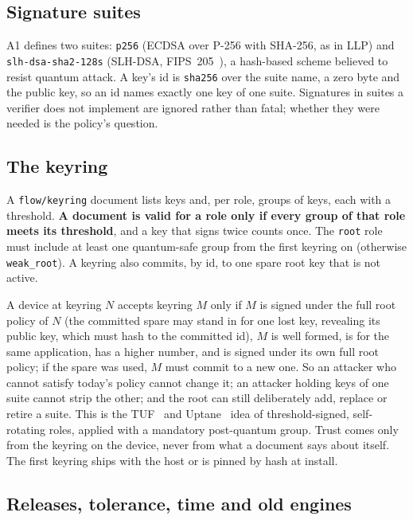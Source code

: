 \documentclass[10pt,twocolumn]{article}
\newcommand{\code}[1]{\texttt{#1}}
\begin{document}
\subsection{Signature suites}

A1 defines two suites: \code{p256} (ECDSA over P-256 with SHA-256, as in LLP) and
\code{slh-dsa-sha2-128s} (SLH-DSA, FIPS~205~\cite{fips205}), a hash-based scheme believed to resist
quantum attack. A key's id is \code{sha256} over the suite name, a zero byte and the public key, so
an id names exactly one key of one suite. Signatures in suites a verifier does not implement are
ignored rather than fatal; whether they were needed is the policy's question.

\subsection{The keyring}

A \code{flow/keyring} document lists keys and, per role, groups of keys, each with a threshold.
\textbf{A document is valid for a role only if every group of that role meets its threshold}, and a
key that signs twice counts once. The \code{root} role must include at least one quantum-safe group
from the first keyring on (otherwise \code{weak\_root}). A keyring also commits, by id, to one spare
root key that is not active.

A device at keyring $N$ accepts keyring $M$ only if $M$ is signed under the full root policy of
$N$ (the committed spare may stand in for one lost key, revealing its public key, which must hash to
the committed id), $M$ is well formed, is for the same application, has a higher number, and is
signed under its own full root policy; if the spare was used, $M$ must commit to a new one. So an
attacker who cannot satisfy today's policy cannot change it; an attacker holding keys of one suite
cannot strip the other; and the root can still deliberately add, replace or retire a suite. This is
the TUF~\cite{samuel2010tuf} and Uptane~\cite{kuppusamy2016uptane} idea of threshold-signed,
self-rotating roles, applied with a mandatory post-quantum group. Trust comes only from the keyring
on the device, never from what a document says about itself. The first keyring ships with the host
or is pinned by hash at install.

\subsection{Releases, tolerance, time and old engines}
\end{document}

